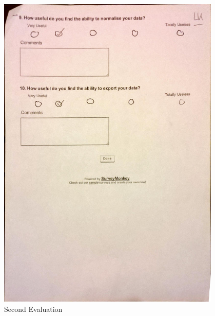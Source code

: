 \begin{figure}[h!]
    \centering
    \includegraphics[width=0.95\textwidth]{images/user_eval/user_eval_14.jpg}
    \caption{Second Evaluation}
\end{figure}

